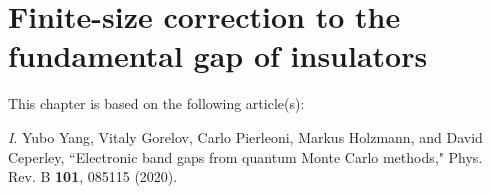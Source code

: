 \chapter{Finite-size correction to the fundamental gap of insulators} \label{chap:gap}
This chapter is based on the following article(s):

\textit{I}. Yubo Yang, Vitaly Gorelov, Carlo Pierleoni, Markus Holzmann, and David Ceperley, ``Electronic band gaps from quantum Monte Carlo methods," Phys. Rev. B \textbf{101}, 085115 (2020).

